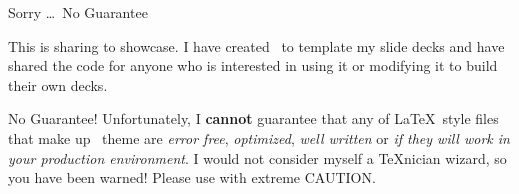\documentclass[\string~/GitHub/sthlmNordBeamerTheme/sthlmNordLightDemo.tex]{subfiles}
\begin{document}
\begin{frame}[c]{Sorry \ldots\ No Guarantee}

	This is sharing to showcase. I have created \snord\ to template my 
    slide decks and have shared the code for anyone who is interested in using it or modifying 
	it to build their own decks.  

	\vspace{1em}

	\begin{alertblock}{No Guarantee!}
		Unfortunately, I \textbf{cannot} guarantee that any of \LaTeX\ style files that make up
		\snord\ theme are \emph{error free}, \emph{optimized}, \emph{well written} or
		\emph{if they will work in your production environment}.  I would not consider
		myself a \TeX nician wizard, so you have been warned!  Please use with extreme
		\alert{CAUTION}.
	\end{alertblock}


\end{frame}
\end{document}
